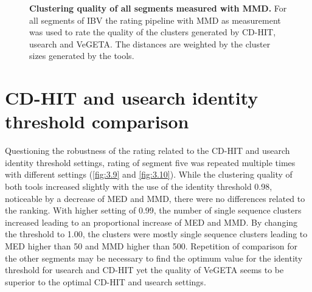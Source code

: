     \begin{figure}[!htb]
        \centering
        \caption[Clustering quality of all segments measured with \gls{MMD}]{\textbf{Clustering quality of all segments measured with \gls{MMD}.} For all segments of \gls{IBV} the rating pipeline with \gls{MMD} as measurement was used to rate the quality of the clusters generated by CD-HIT, usearch and VeGETA. The distances are weighted by the cluster sizes generated by the tools.}
        \label{fig:3.8}
    \end{figure}
    
    \section{CD-HIT and usearch identity threshold comparison}
    
    Questioning the robustness of the rating related to the CD-HIT and usearch identity threshold settings, rating of segment five was repeated multiple times with different settings (\autoref{fig:3.9} and \autoref{fig:3.10}). While the clustering quality of both tools increased slightly with the use of the identity threshold 0.98, noticeable by a decrease of \gls{MED} and \gls{MMD}, there were no differences related to the ranking. With higher setting of 0.99, the number of single sequence clusters increased leading to an proportional increase of \gls{MED} and \gls{MMD}. By changing the threshold to 1.00, the clusters were mostly single sequence clusters leading to \gls{MED} higher than 50 and \gls{MMD} higher than 500. Repetition of comparison for the other segments may be necessary to find the optimum value for the identity threshold for usearch and CD-HIT yet the quality of VeGETA seems to be superior to the optimal CD-HIT and usearch settings. 
    
